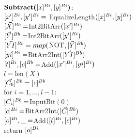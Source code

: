 \begin{protocol}[Subtraction]

    $\textbf{Subtract(}[x]^{Bi}, [y]^{Bi}\textbf{)}$:\\
    \indent $[x']^{Bi}, [y']^{Bi}=$ EqualizeLength$([x]^{Bi}, [y]^{Bi})$ \\
    \indent $[\vec{X}]^{Bb} = $Int2BitArr$([x']^{Bi})$ \\
    \indent $[\vec{Y}]^{Bb} = $Int2BitArr$([y']^{Bi})$ \\
    \indent $[\vec{YI}]^{Bb} = map($NOT$, [\vec{Y}]^{Bb})$ \\
    \indent $[yi]^{Bi} = $BitArr2Int$([\vec{YI}]^{Bb})$ \\
    \indent $[t]^{Bi}, [c]^{Bb} = $Add$([x']^{Bi}, [yi]^{Bi})$ \\
    \indent $l=$len$(X)$ \\
    \indent $[\vec{C_0}]^{Bb} = [c]^{Bb}$ \\
    \indent for $i=1,\ldots,l-1$: \\
    \indent \indent $[\vec{C_i}]^{Bb} = $InputBit$(0)$ \\
    \indent $[c]^{Bi} = $BitArr2Int$([\vec{C}]^{Bb})$ \\
    \indent $[o]^{Bi}, \_ = $Add$([t]^{Bi}, [c]^{Bi})$ \\
    \indent return $[o]^{Bi}$
\end{protocol}

